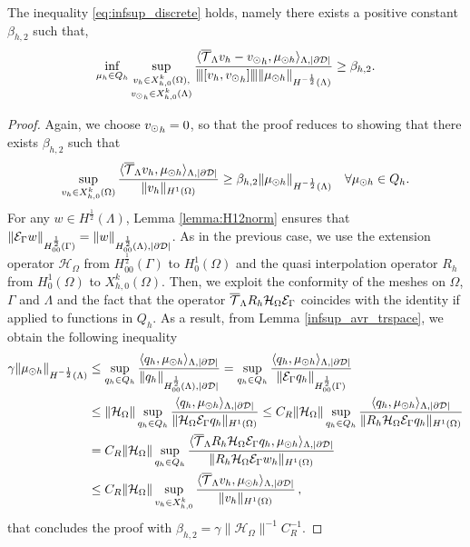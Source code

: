 \documentclass[r]{siamart171218}
\begin{document}
\begin{theorem} 
The inequality \eqref{eq:infsup_discrete} holds, 
namely there exists a positive constant $\beta_{h,2}$ such that,
\begin{equation}
\inf_{\mu_h \in Q_h} 
\sup_{\substack{v_h \in X_{h,0}^k(\Omega),\\ {v_{\odot}}_h \in X_{h,0}^k(\Lambda)} }\frac{\langle {\overline{\mathcal{T}}_\Lambda} v_h -  {v_{\odot}}_h, \mu_{\odot h} \rangle _{\Lambda,|\partial\mathcal{D}|} } {{\left\vert\kern-0.25ex\left\vert\kern-0.25ex\left\vert [v_h, {v_{\odot}}_h] \right\vert\kern-0.25ex\right\vert\kern-0.25ex\right\vert} \|\mu_{\odot h}\|_{H^{-\frac 12 }(\Lambda)} } 
\geq \beta_{h,2}. 
\end{equation}
\end{theorem}
\begin{proof}
 Again, we choose ${v_{\odot}}_h =0$, so that the proof reduces to showing that there exists $\beta_{h,2}$ such that
\begin{equation*}
\sup_{v_h \in X_{h,0}^k(\Omega)} \frac{ \langle {\overline{\mathcal{T}}_\Lambda} v_h , \mu_{\odot h} \rangle _{\Lambda,|\partial\mathcal{D}|} } {\|v_h\|_{H^1(\Omega)} }\geq \beta_{h,2} \|\mu_{\odot h}\|_{H^{-\frac 12}(\Lambda)} 
\quad \forall \mu_{\odot h} \in Q_h.
\end{equation*}
For any $w \in H^{\frac 12}(\Lambda)$, Lemma \ref{lemma:H12norm} ensures that 
$\|\mathcal{E}_\Gamma w\|_{H^{\frac 12}_{00}(\Gamma)} = \|w\|_{H^{\frac 12}_{00}(\Lambda),|\partial\mathcal{D}|}$.
As in the previous case, we use the extension operator $\mathcal{H}_{\Omega}$ from $H^{\frac 12}_{00}(\Gamma)$ to $H^1_0(\Omega)$ and the quasi interpolation operator $R_h$ from $H^1_0(\Omega)$ to $X_{h,0}^k(\Omega)$. Then, we exploit the conformity of the meshes on $\Omega$, $\Gamma$ and $\Lambda$ and the fact that the operator ${\overline{\mathcal{T}}_\Lambda} R_h \mathcal{H}_{\Omega} \mathcal{E}_\Gamma$ coincides with the identity if applied to functions in $Q_h$. As a result, from Lemma \ref{infsup_avr_trspace}, we obtain the following inequality 
\begin{align*}
\gamma \|\mu_{\odot h}\|_{H^{-\frac 12}(\Lambda)} &\leq 
\sup_{q_h \in Q_h} \frac{ \langle q_h, \mu_{\odot h} \rangle_{\Lambda,|\partial\mathcal{D}|} } {\|q_h\|_{H^{\frac 12}_{00}(\Lambda),|\partial\mathcal{D}|}} 
=  \sup_{q_h \in Q_h} \frac{ \langle q_h, \mu_{\odot h} \rangle _{\Lambda,|\partial\mathcal{D}|}} {\|\mathcal{E}_\Gamma q_h\|_{H^{\frac 12}_{00}(\Gamma)}} 
\\
&\leq \|\mathcal{H}_{\Omega}\| \sup_{q_h \in Q_h} \frac{ \langle q_h, \mu_{\odot h} \rangle _{\Lambda,|\partial\mathcal{D}|} } {\|\mathcal{H}_{\Omega} \mathcal{E}_\Gamma q_h\|_{H^1(\Omega)}} 
\leq C_R\|\mathcal{H}_{\Omega}\| \sup_{q_h \in Q_h} \frac{ \langle q_h, \mu_{\odot h} \rangle _{\Lambda,|\partial\mathcal{D}|} } {\|R_h \mathcal{H}_{\Omega} \mathcal{E}_\Gamma q_h\|_{H^1(\Omega)}}
\\
&=  C_R\|\mathcal{H}_{\Omega}\|\sup_{q_h \in Q_h} \frac{ \langle {\overline{\mathcal{T}}_\Lambda} R_h \mathcal{H}_{\Omega} \mathcal{E}_\Gamma q_h, \mu_{\odot h} \rangle _{\Lambda,|\partial\mathcal{D}|}} {\|R_h \mathcal{H}_{\Omega} \mathcal{E}_\Gamma w_h\|_{H^1(\Omega)}} \\
&\leq C_R\|\mathcal{H}_{\Omega}\| \sup_{v_h \in X_{h,0}^k} \frac{ \langle {\overline{\mathcal{T}}_\Lambda} v_h, \mu_{\odot h} \rangle _{\Lambda,|\partial\mathcal{D}|}} {\|v_h\|_{H^1(\Omega)}}\,,
\end{align*}
that concludes the proof with $\beta_{h,2} = \gamma \|\mathcal{H}_{\Omega}\|^{-1} C_R^{-1}$.
\end{proof}
\end{document}
